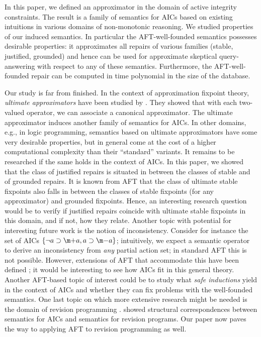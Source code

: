 In this paper, we defined an approximator in the domain of active integrity constraints. 
The result is a family of semantics for AICs based on existing intuitions in various domains of non-monotonic reasoning. 
We studied properties of our induced semantics. 
In particular the AFT-well-founded semantics possesses desirable properties: it approximates all repairs of various families (stable, justified, grounded) and hence can be used for approximate skeptical query-answering with respect to any of these semantics. 
Furthermore, the AFT-well-founded repair can be computed in time polynomial in the size of the database. 

Our study is far from finished. 
In the context of approximation fixpoint theory, \emph{ultimate approximators} have been studied by \citet{DeneckerMT04}. 
They showed that with each two-valued operator, we can associate a canonical approximator. 
The ultimate approximator induces another family of semantics for AICs. 
In other domains, e.g., in logic programming, semantics based on ultimate approximators have some very desirable properties, but in general come at the cost of a higher computational complexity than their ``standard'' variants. 
It remains to be researched if the same holds in the context of AICs. 
In this paper, we showed that the class of justified repairs is situated in between the classes of stable and of grounded repairs. 
It is known from AFT that the class of ultimate stable fixpoints also falls in between the classes of stable fixpoints (for any approximator) and grounded fixpoints. 
Hence, an interesting research question would be to verify if justified repairs coincide with ultimate stable fixpoints in this domain, and if not, how they relate. 
Another topic with potential for interesting future work is the notion of inconsistency. Consider for instance the set of AICs $\{\lnot a \aicrule \add a, a \aicrule \remove a\}$; intuitively, we expect a semantic operator to derive an inconsistency from \emph{any} partial action set; in standard AFT this is not possible. However, extensions of AFT that accommodate this have been defined \cite{RR/BiJF14}; it would be interesting to see how AICs fit in this general theory. 
Another AFT-based topic of interest could be to study what \emph{safe inductions} \cite{ijcai/BogaertsVD17} yield in the context of AICs and whether they can fix problems with the well-founded semantics. 
One last topic on which more extensive research might be needed is the domain of revision programming \cite{tcs/MarekT98}. \citet{tplp/CaropreseT11} showed structural correspondences between semantics for AICs and semantics for revision programs. 
Our paper now paves the way to applying AFT to revision programming as well. 

